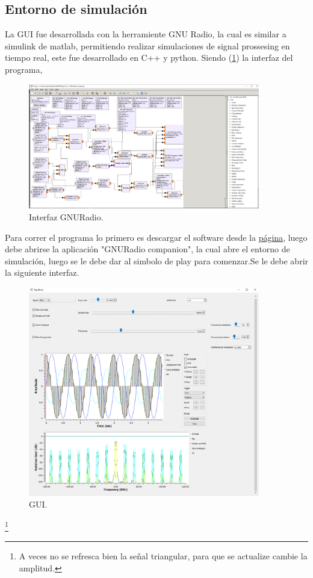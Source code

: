 


\subsection{Entorno de simulación}
La GUI fue desarrollada con la herramiente GNU Radio, la cual es similar a simulink de matlab, permitiendo realizar simulaciones de signal prossesing en tiempo real, este fue desarrollado en C++ y python.
Siendo (\ref{fig:gnu}) la interfaz del programa,
 \begin{figure}[H]
	\centering
	\includegraphics[width=0.9\textwidth]{ImagenesEjercicio5/gnuradio.PNG}
\caption{Interfaz GNURadio.}
	\label{fig:gnu}
\end{figure}
Para correr el programa lo primero es descargar el software desde la \href{http://www.gcndevelopment.com/gnuradio/downloads.htm}{página}, luego debe abrirse la aplicación "GNURadio companion", la cual abre el entorno de simulación, luego se le debe dar al simbolo de play para comenzar.Se le debe abrir la siguiente interfaz.
 \begin{figure}[H]
	\centering
	\includegraphics[width=0.9\textwidth]{ImagenesEjercicio5/gui.PNG}
\caption{GUI.}
	\label{fig:GUI}
\end{figure}
\footnote{A veces no se refresca bien la señal triangular, para que se actualize cambie la amplitud.}
